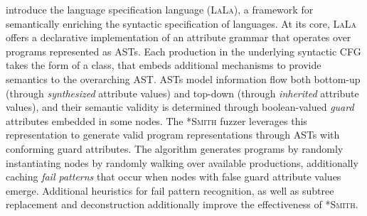 \citet{kreutzer2020language} introduce the language specification language
(\textsc{LaLa}), a framework for semantically enriching the syntactic
specification of languages.
At its core, \textsc{LaLa} offers a declarative implementation of an
attribute grammar that operates over programs represented as \gls{AST}s.
Each production in the underlying syntactic \gls{CFG} takes the form of a
class, that embeds additional mechanisms to provide semantics to the
overarching \gls{AST}.
\gls{AST}s model information flow both bottom-up (through
\textit{synthesized} attribute values) and top-down (through
\textit{inherited} attribute values), and their semantic validity
is determined through boolean-valued \textit{guard} attributes embedded in
some nodes.
The \textsc{*Smith} fuzzer leverages this representation to generate valid
program representations through \gls{AST}s with conforming guard attributes.
The algorithm generates programs by randomly instantiating nodes by randomly
walking over available productions, additionally caching \textit{fail patterns}
that occur when nodes with false guard attribute values emerge.
Additional heuristics for fail pattern recognition, as well as subtree
replacement and deconstruction additionally improve the effectiveness
of \textsc{*Smith}.
